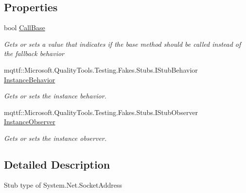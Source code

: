 \subsection*{Properties}
\begin{DoxyCompactItemize}
\item 
bool \hyperlink{class_system_1_1_net_1_1_fakes_1_1_stub_socket_address_ad1b53cbf0fddf7d9cb75831dcfb5cbae}{Call\-Base}
\begin{DoxyCompactList}\small\item\em Gets or sets a value that indicates if the base method should be called instead of the fallback behavior\end{DoxyCompactList}\item 
mqttf\-::\-Microsoft.\-Quality\-Tools.\-Testing.\-Fakes.\-Stubs.\-I\-Stub\-Behavior \hyperlink{class_system_1_1_net_1_1_fakes_1_1_stub_socket_address_a42b74d6fb68597e577106b58987a0f06}{Instance\-Behavior}
\begin{DoxyCompactList}\small\item\em Gets or sets the instance behavior.\end{DoxyCompactList}\item 
mqttf\-::\-Microsoft.\-Quality\-Tools.\-Testing.\-Fakes.\-Stubs.\-I\-Stub\-Observer \hyperlink{class_system_1_1_net_1_1_fakes_1_1_stub_socket_address_a9d80e0414df2a614981ad4d727fbe93e}{Instance\-Observer}
\begin{DoxyCompactList}\small\item\em Gets or sets the instance observer.\end{DoxyCompactList}\end{DoxyCompactItemize}


\subsection{Detailed Description}
Stub type of System.\-Net.\-Socket\-Address



